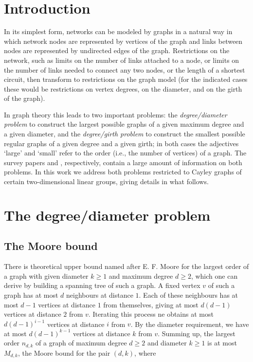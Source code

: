 \documentclass[a4paper,12pt,oneside]{report}%
\begin{document}
\newpage

\section{Introduction}

In its simplest form, networks can be modeled by graphs in a natural way in which network nodes are represented by vertices of the graph and links between nodes are represented by undirected edges of the graph. Restrictions on the network, such as limits on the number of links attached to a node, or limits on the number of links needed to connect any two nodes, or the length of a shortest circuit, then transform to restrictions on the graph model (for the indicated cases these would be restrictions on vertex degrees, on the diameter, and on the girth of the graph).
\medskip

In graph theory this leads to two important problems: the {\em degree/diameter problem} to construct the largest possible graphs of a given maximum degree and a given diameter, and the {\em degree/girth problem} to construct the smallest possible regular graphs of a given degree and a given girth; in both cases the adjectives `large' and `small' refer to the order (i.e., the number of vertices) of a graph. The survey papers \cite{Mil-Sir} and \cite{Exo-Jaj}, respectively, contain a large amount of information on both problems. In this work we address both problems restricted to Cayley graphs of certain two-dimensional linear groups, giving details in what follows.


\newpage


\section{The degree/diameter problem}
\subsection{The Moore bound}

There is theoretical upper bound named after E. F. Moore for the largest order of a graph with given diameter $k\ge 1$ and maximum degree $d\ge 2$, which one can derive by building a spanning tree of such a graph. A fixed vertex $v$ of such a graph has at most $d$ neighbours at distance $1$. Each of these neighbours has at most $d-1$ vertices at distance $1$ from themselves, giving at most $d(d-1)$ vertices at distance $2$ from $v$. Iterating this process ne obtains at most $d(d-1)^{i-1}$ vertices at distance $i$ from $v$. By the diameter requirement, we have at most $d(d-1)^{k-1}$ vertices at distance $k$ from $v$. Summing up, the largest order $n_{d,k}$ of a graph of maximum degree $d\ge 2$ and diameter $k\ge 1$ is at most $M_{d,k}$, the Moore bound for the pair $(d,k)$, where
\end{document}
